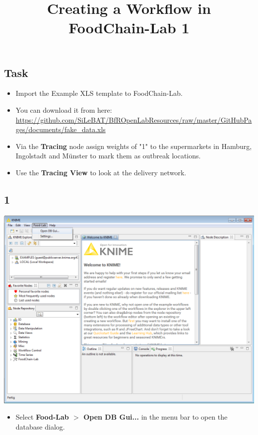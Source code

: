 \documentclass{beamer}
\title{Creating a Workflow in FoodChain-Lab 1}
\date{}
\begin{document}
\maketitle

\section{ }

\subsection{Task}
\begin{frame}
	\begin{itemize}
		\item Import the Example XLS template to FoodChain-Lab.
		\item You can download it from here: \url{https://github.com/SiLeBAT/BfROpenLabResources/raw/master/GitHubPages/documents/fake_data.xls}
		\item Via the \textbf{Tracing} node assign weights of "1" to the supermarkets in Hamburg, Ingolstadt and Münster to mark them as outbreak locations.
		\item Use the \textbf{Tracing View} to look at the delivery network.
	\end{itemize}
\end{frame}
 
\subsection{1}
\begin{frame}
	\begin{center}
  		\includegraphics[height=0.6\textheight]{1.png}
	\end{center}
	\begin{itemize}
		\item Select \textbf{Food-Lab $>$ Open DB Gui...} in the menu bar to open the database dialog.
	\end{itemize}
\end{frame}
\end{document}
